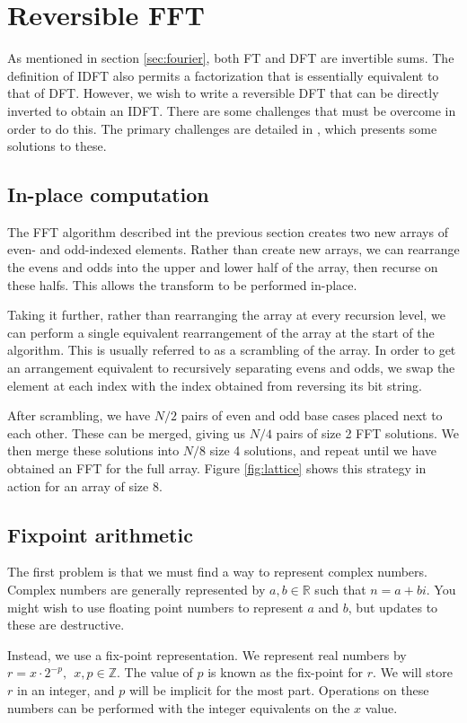 \section{Reversible FFT}
As mentioned in section \ref{sec:fourier},
both FT and DFT are invertible sums.
The definition of IDFT also permits a factorization that is essentially equivalent to that of DFT.
However, we wish to write a reversible DFT that can be directly inverted to obtain an IDFT.
There are some challenges that must be overcome in order to do this.
The primary challenges are detailed in \cite{intfft},
which presents some solutions to these.

\subsection{In-place computation}
The FFT algorithm described int the previous section
creates two new arrays of even- and odd-indexed elements.
Rather than create new arrays,
we can rearrange the evens and odds into the upper and lower half of the array,
then recurse on these halfs.
This allows the transform to be performed in-place.

Taking it further, rather than rearranging the array at every recursion level,
we can perform a single equivalent rearrangement of the array at the start of the algorithm.
This is usually referred to as a scrambling of the array.
In order to get an arrangement equivalent to recursively separating evens and odds,
we swap the element at each index with the index obtained from reversing its bit string.

After scrambling,
we have $N/2$ pairs of even and odd base cases placed next to each other.
These can be merged, giving us $N/4$ pairs of size 2 FFT solutions.
We then merge these solutions into $N/8$ size 4 solutions,
and repeat until we have obtained an FFT for the full array.
Figure \ref{fig:lattice} shows this strategy in action for an array of size 8.


\subsection{Fixpoint arithmetic}
The first problem is that we must find a way to represent complex numbers.
Complex numbers are generally represented by $a, b \in \mathbb{R}$ such that $n = a + bi$.
You might wish to use floating point numbers to represent $a$ and $b$,
but updates to these are destructive.

Instead, we use a fix-point representation.
We represent real numbers by $r = x \cdot 2^{-p},~~ x, p \in \mathbb{Z}$.
The value of $p$ is known as the fix-point for $r$.
We will store $r$ in an integer, and $p$ will be implicit for the most part.
Operations on these numbers can be performed with the integer equivalents on the $x$ value.

